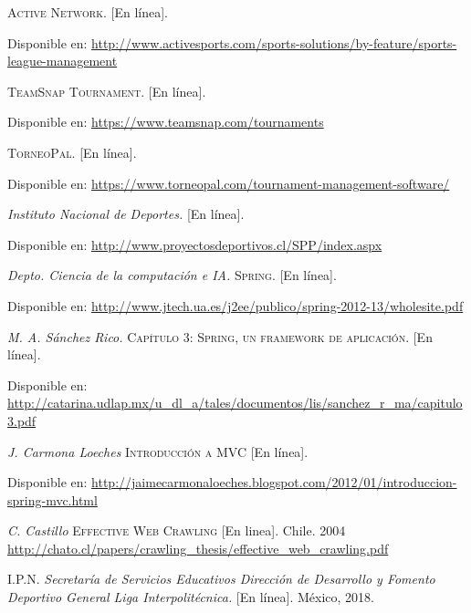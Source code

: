 \begin{thebibliography}{}
	\textit{}
	\textsc{Active Network.} [En línea].
	
	Disponible en: 
	\url{http://www.activesports.com/sports-solutions/by-feature/sports-league-management}
	
	\textit{}
	\textsc{TeamSnap Tournament.} [En línea].
	
	Disponible en:
	\url{https://www.teamsnap.com/tournaments}
	
	\textit{}
	\textsc{TorneoPal.} [En línea].
	
	Disponible en: 
	\url{ https://www.torneopal.com/tournament-management-software/}
	
	\textit{Instituto Nacional de Deportes.}
	\textsc{}[En línea].
	
	Disponible en:
	\url{http://www.proyectosdeportivos.cl/SPP/index.aspx}
	
	\textit{Depto. Ciencia de la computación e IA.}
	\textsc{Spring.} [En línea]. 
	
	Disponible en:
	\url{http://www.jtech.ua.es/j2ee/publico/spring-2012-13/wholesite.pdf}
	
	\textit{M. A. Sánchez Rico.}
	\textsc{Capítulo 3: Spring, un framework de aplicación.} [En línea].
	
	Disponible en:
	\url{http://catarina.udlap.mx/u_dl_a/tales/documentos/lis/sanchez_r_ma/capitulo3.pdf}
	
	\textit{J. Carmona Loeches}
	\textsc{Introducción a MVC} [En línea]. 
	
	Disponible en: 
	\url{http://jaimecarmonaloeches.blogspot.com/2012/01/introduccion-spring-mvc.html}
	
	\textit{C. Castillo}
	\textsc{Effective Web Crawling}
	[En linea]. Chile. 2004
	\url{http://chato.cl/papers/crawling_thesis/effective_web_crawling.pdf}
	
	\textsc{I.P.N.}
	\textit{Secretaría de Servicios Educativos Dirección de Desarrollo y Fomento Deportivo General Liga Interpolitécnica.}
	[En línea]. México, 2018.
	

\end{thebibliography}
